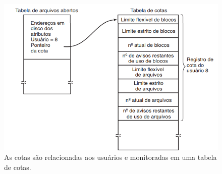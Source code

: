 \begin{figure}[htpb]
    \centering
   \includegraphics[scale=0.6]{imagens/CotaDisco.png}
   \caption{As cotas são relacionadas aos usuários e monitoradas em uma tabela de cotas. \cite{Tanenbaum2016}}
   \label{fig:CotaDisco}
\end{figure} 